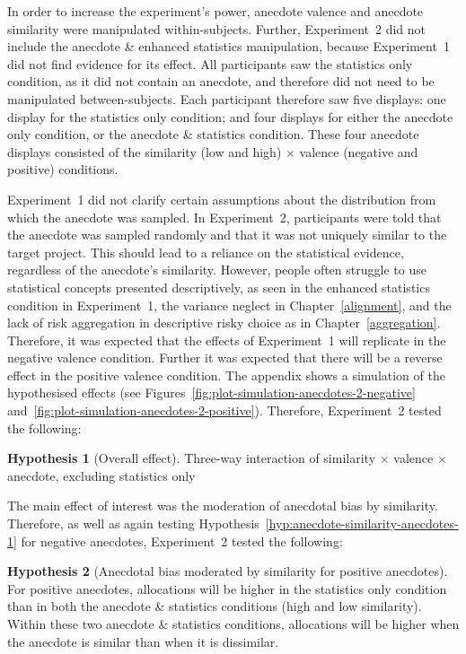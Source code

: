 \documentclass[a4paper, nobind, dvipsnames]{templates/ociamthesis}
\theoremstyle{definition}
\theoremstyle{definition}
\theoremstyle{definition}
\theoremstyle{definition}
\newtheorem{hypothesis}{Hypothesis}[chapter]
\theoremstyle{remark}
\begin{document}
In order to increase the experiment's power, anecdote valence and anecdote
similarity were manipulated within-subjects. Further, Experiment~2 did not
include the anecdote \& enhanced statistics manipulation, because Experiment~1
did not find evidence for its effect. All participants saw the statistics only
condition, as it did not contain an anecdote, and therefore did not need to be
manipulated between-subjects. Each participant therefore saw five displays: one
display for the statistics only condition; and four displays for either the
anecdote only condition, or the anecdote \& statistics condition. These four
anecdote displays consisted of the similarity (low and high) \(\times\) valence
(negative and positive) conditions.

Experiment~1 did not clarify certain assumptions about the distribution from
which the anecdote was sampled. In Experiment~2, participants were told that the
anecdote was sampled randomly and that it was not uniquely similar to the target
project. This should lead to a reliance on the statistical evidence, regardless
of the anecdote's similarity. However, people often struggle to use statistical
concepts presented descriptively, as seen in the enhanced statistics condition
in Experiment~1, the variance neglect in Chapter~\ref{alignment}, and the lack
of risk aggregation in descriptive risky choice as in
Chapter~\ref{aggregation}. Therefore, it was expected that the effects of
Experiment~1 will replicate in the negative valence condition. Further it was
expected that there will be a reverse effect in the positive valence condition.
The appendix shows a simulation of the hypothesised effects (see
Figures~\ref{fig:plot-simulation-anecdotes-2-negative}
and~\ref{fig:plot-simulation-anecdotes-2-positive}). Therefore, Experiment~2
tested the following:

\begin{hypothesis}[Overall effect]
\protect\hypertarget{hyp:three-way-anecdotes-2}{}{\label{hyp:three-way-anecdotes-2} {} }Three-way interaction of similarity \(\times\) valence \(\times\) anecdote,
excluding statistics only
\end{hypothesis}

The main effect of interest was the moderation of anecdotal bias by similarity.
Therefore, as well as again testing
Hypothesis~\ref{hyp:anecdote-similarity-anecdotes-1} for negative anecdotes,
Experiment~2 tested the following:

\begin{hypothesis}[Anecdotal bias moderated by similarity for positive anecdotes]
\protect\hypertarget{hyp:anecdote-similarity-anecdotes-2}{}{\label{hyp:anecdote-similarity-anecdotes-2} {} }For positive anecdotes, allocations will be higher in the statistics only
condition than in both the anecdote \& statistics conditions (high and low
similarity). Within these two anecdote \& statistics conditions, allocations will
be higher when the anecdote is similar than when it is dissimilar.
\end{hypothesis}
\end{document}
